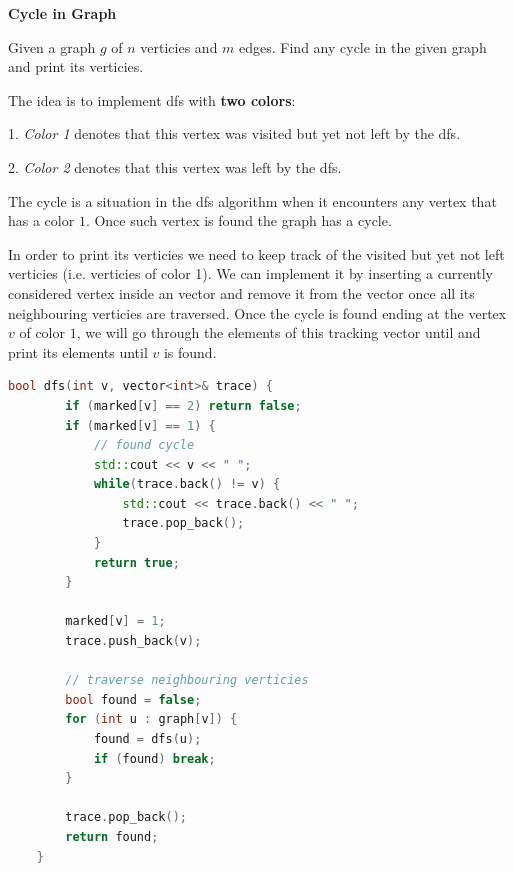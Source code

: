 \begin{problem}\textbf{Cycle in Graph}

    Given a graph $g$ of $n$ verticies and $m$ edges. Find any cycle in the given graph and print its verticies.
\end{problem}


\begin{solution}

    The idea is to implement dfs with \textbf{two colors}:

    1. \textit{Color 1} denotes that this vertex was visited but yet not left by the dfs.

    2. \textit{Color 2} denotes that this vertex was left by the dfs.

    The cycle is a situation in the dfs algorithm when it encounters any vertex that has a color $1$. Once such vertex is found the graph has a cycle.

    In order to print its verticies we need to keep track of the visited but yet not left verticies (i.e. verticies of color 1). We can implement it by inserting a currently considered vertex inside an vector and remove it from the vector once all its neighbouring verticies are traversed. Once the cycle is found ending at the vertex $v$ of color $1$, we will go through the elements of this tracking vector until and print its elements until $v$ is found.

    \begin{lstlisting}[language=C++]
    bool dfs(int v, vector<int>& trace) {
        if (marked[v] == 2) return false;
        if (marked[v] == 1) {
            // found cycle
            std::cout << v << " ";
            while(trace.back() != v) {
                std::cout << trace.back() << " ";
                trace.pop_back();
            }
            return true;
        }

        marked[v] = 1;
        trace.push_back(v);

        // traverse neighbouring verticies
        bool found = false;
        for (int u : graph[v]) {
            found = dfs(u);
            if (found) break;
        }

        trace.pop_back();
        return found;
    }
    \end{lstlisting}

\end{solution}



